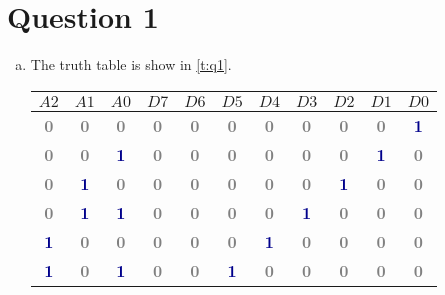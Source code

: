 \documentclass[11pt]{article} %
\begin{document}
\section*{Question 1}
\begin{enumerate}[(a)]
	\item The truth table is show in \cref{t:q1}.
\begin{table}[htbp]
	\centering
	\begin{tabular}{ c c c | c c c c c c c c }
		$A2$ & $A1$ & $A0$ & $D7$ & $D6$ & $D5$ & $D4$ & $D3$ & $D2$ & $D1$ & $D0$ \\
		\hline
		\textcolor{gray}{\textbf{0}} & \textcolor{gray}{\textbf{0}} & \textcolor{gray}{\textbf{0}} & \textcolor{gray}{\textbf{0}} & \textcolor{gray}{\textbf{0}} & \textcolor{gray}{\textbf{0}} & \textcolor{gray}{\textbf{0}} & \textcolor{gray}{\textbf{0}} & \textcolor{gray}{\textbf{0}} & \textcolor{gray}{\textbf{0}} & \textcolor{darkBlue}{\textbf{1}} \\
		\textcolor{gray}{\textbf{0}} & \textcolor{gray}{\textbf{0}} & \textcolor{darkBlue}{\textbf{1}} & \textcolor{gray}{\textbf{0}} & \textcolor{gray}{\textbf{0}} & \textcolor{gray}{\textbf{0}} & \textcolor{gray}{\textbf{0}} & \textcolor{gray}{\textbf{0}} & \textcolor{gray}{\textbf{0}} & \textcolor{darkBlue}{\textbf{1}} & \textcolor{gray}{\textbf{0}} \\
		\textcolor{gray}{\textbf{0}} & \textcolor{darkBlue}{\textbf{1}} & \textcolor{gray}{\textbf{0}} & \textcolor{gray}{\textbf{0}} & \textcolor{gray}{\textbf{0}} & \textcolor{gray}{\textbf{0}} & \textcolor{gray}{\textbf{0}} & \textcolor{gray}{\textbf{0}} & \textcolor{darkBlue}{\textbf{1}} & \textcolor{gray}{\textbf{0}} & \textcolor{gray}{\textbf{0}} \\
		\textcolor{gray}{\textbf{0}} & \textcolor{darkBlue}{\textbf{1}} & \textcolor{darkBlue}{\textbf{1}} & \textcolor{gray}{\textbf{0}} & \textcolor{gray}{\textbf{0}} & \textcolor{gray}{\textbf{0}} & \textcolor{gray}{\textbf{0}} & \textcolor{darkBlue}{\textbf{1}} & \textcolor{gray}{\textbf{0}} & \textcolor{gray}{\textbf{0}} & \textcolor{gray}{\textbf{0}} \\
		\textcolor{darkBlue}{\textbf{1}} & \textcolor{gray}{\textbf{0}} & \textcolor{gray}{\textbf{0}} & \textcolor{gray}{\textbf{0}} & \textcolor{gray}{\textbf{0}} & \textcolor{gray}{\textbf{0}} & \textcolor{darkBlue}{\textbf{1}} & \textcolor{gray}{\textbf{0}} & \textcolor{gray}{\textbf{0}} & \textcolor{gray}{\textbf{0}} & \textcolor{gray}{\textbf{0}} \\
		\textcolor{darkBlue}{\textbf{1}} & \textcolor{gray}{\textbf{0}} & \textcolor{darkBlue}{\textbf{1}} & \textcolor{gray}{\textbf{0}} & \textcolor{gray}{\textbf{0}} & \textcolor{darkBlue}{\textbf{1}} & \textcolor{gray}{\textbf{0}} & \textcolor{gray}{\textbf{0}} & \textcolor{gray}{\textbf{0}} & \textcolor{gray}{\textbf{0}} & \textcolor{gray}{\textbf{0}} \\

\end{tabular}
\end{table}
\end{enumerate}
\end{document}
